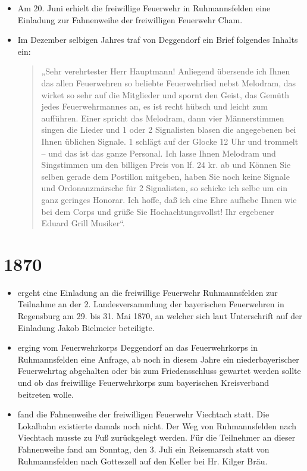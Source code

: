 \documentclass[12pt,a4paper]{book}
\begin{document}
\begin{itemize}
\item Am 20. Juni erhielt die freiwillige Feuerwehr in Ruhmannsfelden
eine Einladung zur Fahnenweihe der freiwilligen Feuerwehr Cham.

\item Im Dezember selbigen Jahres traf von Deggendorf ein Brief
folgendes Inhalts ein:

\begin{quote}
„Sehr verehrtester Herr Hauptmann! Anliegend übersende ich Ihnen das
allen Feuerwehren so beliebte Feuerwehrlied nebst Melodram, das wirket
so sehr auf die Mitglieder und spornt den Geist, das Gemüth jedes
Feuerwehrmannes an, es ist recht hübsch und leicht zum aufführen. Einer
spricht das Melodram, dann vier Männerstimmen singen die Lieder und 1
oder 2 Signalisten blasen die angegebenen bei Ihnen üblichen Signale. 1
schlägt auf der Glocke 12 Uhr und trommelt – und das ist das ganze
Personal. Ich lasse Ihnen Melodram und Singstimmen um den billigen Preis
von lf. 24 kr. ab und Können Sie selben gerade dem Postillon mitgeben,
haben Sie noch keine Signale und Ordonanzmärsche für 2 Signalisten, so
schicke ich selbe um ein ganz geringes Honorar. Ich hoffe, daß ich eine
Ehre aufhebe Ihnen wie bei dem Corps und grüße Sie Hochachtungsvollst!
Ihr ergebener Eduard Grill Musiker“.
\end{quote}
\end{itemize}

\section*{1870}

\begin{itemize}
\item ergeht eine Einladung an die freiwillige Feuerwehr Ruhmannsfelden
zur Teilnahme an der 2. Landesversammlung der bayerischen Feuerwehren in
Regensburg am 29. bis 31. Mai 1870, an welcher sich laut Unterschrift
auf der Einladung Jakob Bielmeier beteiligte.

\item erging vom Feuerwehrkorps Deggendorf an das Feuerwehrkorps in
Ruhmannsfelden eine Anfrage, ab noch in diesem Jahre ein
niederbayerischer Feuerwehrtag abgehalten oder bis zum Friedensschluss
gewartet werden sollte und ob das freiwillige Feuerwehrkorps zum
bayerischen Kreisverband beitreten wolle.

\item fand die Fahnenweihe der freiwilligen Feuerwehr Viechtach statt.
Die Lokalbahn existierte damals noch nicht. Der Weg von Ruhmannsfelden
nach Viechtach musste zu Fuß zurückgelegt werden. Für die Teilnehmer an
dieser Fahnenweihe fand am Sonntag, den 3. Juli ein Reisemarsch statt
von Ruhmannsfelden nach Gotteszell auf den Keller bei Hr. Kilger Bräu.
\end{itemize}
\end{document}

